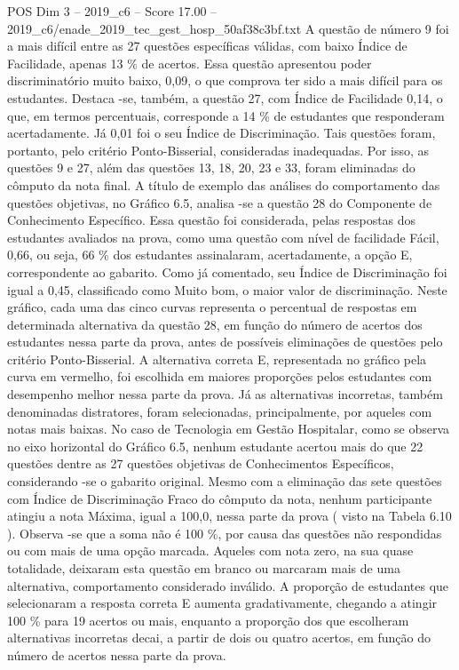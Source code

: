 \begin{textsample}{POS Dim 3 – 2019\_c6 – Score 17.00 – 2019\_c6/enade\_2019\_tec\_gest\_hosp\_50af38c3bf.txt}
A questão de número 9 foi a mais difícil entre as 27 questões específicas válidas, com baixo Índice de Facilidade, apenas 13 \% de acertos.
Essa questão apresentou poder discriminatório muito baixo, 0,09, o que comprova ter sido a mais difícil para os estudantes.
Destaca -se, também, a questão 27, com Índice de Facilidade 0,14, o que, em termos percentuais, corresponde a 14 \% de estudantes que responderam acertadamente.
Já 0,01 foi o seu Índice de Discriminação.
Tais questões foram, portanto, pelo critério Ponto-Bisserial, consideradas inadequadas.
Por isso, as questões 9 e 27, além das questões 13, 18, 20, 23 e 33, foram eliminadas do cômputo da nota final.
A título de exemplo das análises do comportamento das questões objetivas, no Gráfico 6.5, analisa -se a questão 28 do Componente de Conhecimento Específico.
Essa questão foi considerada, pelas respostas dos estudantes avaliados na prova, como uma questão com nível de facilidade Fácil, 0,66, ou seja, 66 \% dos estudantes assinalaram, acertadamente, a opção E, correspondente ao gabarito.
Como já comentado, seu Índice de Discriminação foi igual a 0,45, classificado como Muito bom, o maior valor de discriminação.
Neste gráfico, cada uma das cinco curvas representa o percentual de respostas em determinada alternativa da questão 28, em função do número de acertos dos estudantes nessa parte da prova, antes de possíveis eliminações de questões pelo critério Ponto-Bisserial.
A alternativa correta E, representada no gráfico pela curva em vermelho, foi escolhida em maiores proporções pelos estudantes com desempenho melhor nessa parte da prova.
Já as alternativas incorretas, também denominadas distratores, foram selecionadas, principalmente, por aqueles com notas mais baixas.
No caso de Tecnologia em Gestão Hospitalar, como se observa no eixo horizontal do Gráfico 6.5, nenhum estudante acertou mais do que 22 questões dentre as 27 questões objetivas de Conhecimentos Específicos, considerando -se o gabarito original.
Mesmo com a eliminação das sete questões com Índice de Discriminação Fraco do cômputo da nota, nenhum participante atingiu a nota Máxima, igual a 100,0, nessa parte da prova ( visto na Tabela 6.10 ).
Observa -se que a soma não é 100 \%, por causa das questões não respondidas ou com mais de uma opção marcada.
Aqueles com nota zero, na sua quase totalidade, deixaram esta questão em branco ou marcaram mais de uma alternativa, comportamento considerado inválido.
A proporção de estudantes que selecionaram a resposta correta E aumenta gradativamente, chegando a atingir 100 \% para 19 acertos ou mais, enquanto a proporção dos que escolheram alternativas incorretas decai, a partir de dois ou quatro acertos, em função do número de acertos nessa parte da prova.

\end{textsample}
